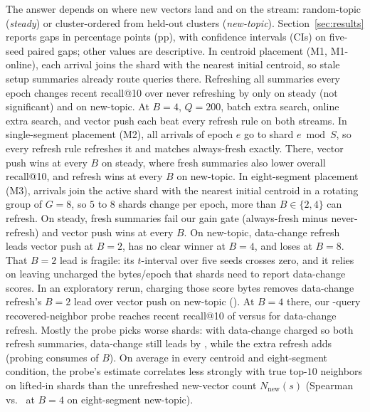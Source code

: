 The answer depends on where new vectors land and on the stream: random-topic (\emph{steady}) or cluster-ordered from held-out clusters (\emph{new-topic}). Section~\ref{sec:results} reports gaps in percentage points (pp), with \RNumCIPct{} confidence intervals (CIs) on five-seed paired gaps; other values are descriptive. In centroid placement (M1, M1-online), each arrival joins the shard with the nearest initial centroid, so stale setup summaries already route queries there. Refreshing all summaries every epoch changes recent recall@10 over never refreshing by only \RNumHOneGapSteady{} on steady (not significant) and \RNumHOneGapNewTopic{} on new-topic. At $B = 4$, $Q = 200$, batch extra search, online extra search, and vector push each beat every refresh rule on both streams. In single-segment placement (M2), all arrivals of epoch $e$ go to shard $e \bmod S$, so every refresh rule refreshes it and matches always-fresh exactly. There, vector push wins at every $B$ on steady, where fresh summaries also lower overall recall@10, and refresh wins at every $B$ on new-topic. In eight-segment placement (M3), arrivals join the active shard with the nearest initial centroid in a rotating group of $G = 8$, so $5$ to $8$ shards change per epoch, more than $B \in \{2, 4\}$ can refresh. On steady, fresh summaries fail our \RNumGateThresholdPP{} gain gate (always-fresh minus never-refresh) and vector push wins at every $B$. On new-topic, data-change refresh leads vector push at $B = 2$, has no clear winner at $B = 4$, and loses at $B = 8$. That $B = 2$ lead is fragile: its $t$-interval over five seeds crosses zero, and it relies on leaving uncharged the \RNumDCScoreEpochBytes{} bytes/epoch that shards need to report data-change scores. In an exploratory rerun, charging those score bytes removes data-change refresh's $B = 2$ lead over vector push on new-topic (\RNumAddThreeXTwoPVBTwoNewTopic{}). At $B = 4$ there, our \RNumSampleQueries{}-query recovered-neighbor probe reaches recent recall@10 of \RNumMThreeRNRecentBFourNewTopic{} versus \RNumMThreeDCRecentBFourNewTopic{} for data-change refresh. Mostly the probe picks worse shards: with data-change charged so both refresh \RNumRNSummariesBFour{} summaries, data-change still leads by \RNumAddThreeXOneRNBFourNewTopic{}, while the extra refresh adds \RNumAddThreeXThreeDCBFourNewTopicAbsMean{} (probing consumes \RNumRNOverheadShareBFour{} of $B$). On average in every centroid and eight-segment condition, the probe's estimate correlates less strongly with true top-$10$ neighbors on lifted-in shards than the unrefreshed new-vector count $N_{\text{new}}(s)$ (Spearman \RNumSpearmanRNNewTopicMThree{} vs.\ \RNumSpearmanNewVecsNewTopicMThree{} at $B{=}4$ on eight-segment new-topic).

